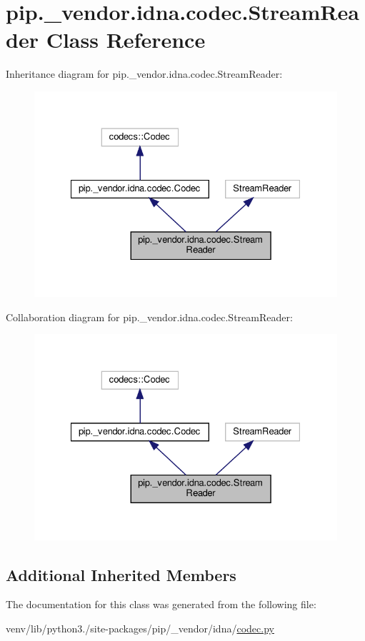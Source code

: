 \hypertarget{classpip_1_1__vendor_1_1idna_1_1codec_1_1StreamReader}{}\section{pip.\+\_\+vendor.\+idna.\+codec.\+Stream\+Reader Class Reference}
\label{classpip_1_1__vendor_1_1idna_1_1codec_1_1StreamReader}


Inheritance diagram for pip.\+\_\+vendor.\+idna.\+codec.\+Stream\+Reader\+:
\nopagebreak
\begin{figure}[H]
\begin{center}
\leavevmode
\includegraphics[width=328pt]{classpip_1_1__vendor_1_1idna_1_1codec_1_1StreamReader__inherit__graph}
\end{center}
\end{figure}


Collaboration diagram for pip.\+\_\+vendor.\+idna.\+codec.\+Stream\+Reader\+:
\nopagebreak
\begin{figure}[H]
\begin{center}
\leavevmode
\includegraphics[width=328pt]{classpip_1_1__vendor_1_1idna_1_1codec_1_1StreamReader__coll__graph}
\end{center}
\end{figure}
\subsection*{Additional Inherited Members}


The documentation for this class was generated from the following file\+:\begin{DoxyCompactItemize}
\item 
venv/lib/python3./site-\/packages/pip/\+\_\+vendor/idna/\hyperlink{codec_8py}{codec.\+py}\end{DoxyCompactItemize}
